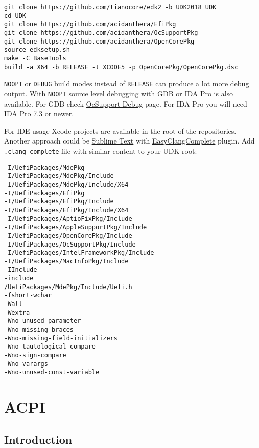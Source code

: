 \documentclass[]{article}
\begin{document}
\begin{lstlisting}[caption=Compilation Commands, label=compile, style=ocbash]
git clone https://github.com/tianocore/edk2 -b UDK2018 UDK
cd UDK
git clone https://github.com/acidanthera/EfiPkg
git clone https://github.com/acidanthera/OcSupportPkg
git clone https://github.com/acidanthera/OpenCorePkg
source edksetup.sh
make -C BaseTools
build -a X64 -b RELEASE -t XCODE5 -p OpenCorePkg/OpenCorePkg.dsc
\end{lstlisting}

\texttt{NOOPT} or \texttt{DEBUG} build modes instead of \texttt{RELEASE}
can produce a lot more debug output. With \texttt{NOOPT} source level debugging with
GDB or IDA Pro is also available. For GDB check
\href{https://github.com/acidanthera/OcSupportPkg/tree/master/Debug}{OcSupport Debug}
page. For IDA Pro you will need IDA Pro 7.3 or newer.

For IDE usage Xcode projects are available in the root of the repositories. Another
approach could be \href{https://www.sublimetext.com}{Sublime Text} with
\href{https://niosus.github.io/EasyClangComplete}{EasyClangComplete} plugin.
Add \texttt{.clang\_complete} file with similar content to your UDK root:

\begin{lstlisting}[caption=ECC Configuration, label=eccfile, style=ocbash]
-I/UefiPackages/MdePkg
-I/UefiPackages/MdePkg/Include
-I/UefiPackages/MdePkg/Include/X64
-I/UefiPackages/EfiPkg
-I/UefiPackages/EfiPkg/Include
-I/UefiPackages/EfiPkg/Include/X64
-I/UefiPackages/AptioFixPkg/Include
-I/UefiPackages/AppleSupportPkg/Include
-I/UefiPackages/OpenCorePkg/Include
-I/UefiPackages/OcSupportPkg/Include
-I/UefiPackages/IntelFrameworkPkg/Include
-I/UefiPackages/MacInfoPkg/Include
-IInclude
-include
/UefiPackages/MdePkg/Include/Uefi.h
-fshort-wchar
-Wall
-Wextra
-Wno-unused-parameter
-Wno-missing-braces
-Wno-missing-field-initializers
-Wno-tautological-compare
-Wno-sign-compare
-Wno-varargs
-Wno-unused-const-variable
\end{lstlisting}

\section{ACPI}\label{acpi}

\subsection{Introduction}\label{acpiintro}
\end{document}
